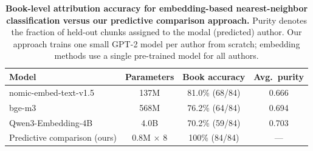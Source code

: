 \documentclass[10pt]{article}
\begin{document}
\begin{table}[h]
\centering
\begin{tabular}{lccc}
\toprule
\textbf{Model} & \textbf{Parameters} & \textbf{Book accuracy} & \textbf{Avg.\ purity} \\
\midrule
nomic-embed-text-v1.5 & 137M & 81.0\% (68/84) & 0.666 \\
bge-m3 & 568M & 76.2\% (64/84) & 0.694 \\
Qwen3-Embedding-4B & 4.0B & 70.2\% (59/84) & 0.703 \\
\midrule
Predictive comparison (ours) & 0.8M $\times$ 8 & 100\% (84/84) & --- \\
\bottomrule
\end{tabular}
\caption{\textbf{Book-level attribution accuracy for embedding-based
nearest-neighbor classification versus our predictive comparison approach.}
Purity denotes the fraction of held-out chunks assigned to the modal
(predicted) author. Our approach trains one small GPT-2 model per author from
scratch; embedding methods use a single pre-trained model for all authors.}
\label{tab:embedding-comparison}
\end{table}
\end{document}
